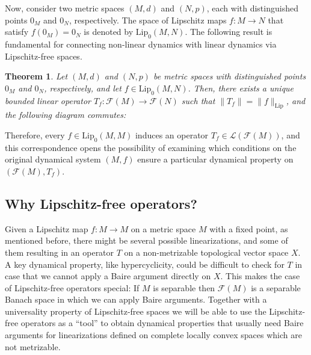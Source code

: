 \documentclass[12pt,english]{amsart}
\numberwithin{equation}{section}
\theoremstyle{plain}
\newtheorem{theorem}{Theorem}[section]
\theoremstyle{definition}
\def\lip{ \text{Lip}}
\begin{document}
Now, consider two metric spaces $(M,d)$ and $(N,p)$, each with distinguished points $0_M$ and $0_N$, respectively. The space of Lipschitz maps $f\colon M \to N$ that satisfy $f(0_M) = 0_N$ is denoted by $\lip_0(M,N)$. The following result is fundamental for connecting non-linear dynamics with linear dynamics via Lipschitz-free spaces.

\begin{theorem}\label{thm:linearization}
    Let $(M,d)$ and $(N,p)$ be metric spaces with distinguished points $0_M$ and $0_N$, respectively, and let $f \in \lip_0(M,N)$. Then, there exists a unique bounded linear operator $T_f \colon \mathcal{F}(M) \to \mathcal{F}(N)$ such that $\|T_f\| = \|f\|_{\text{Lip}}$, and the following diagram commutes:

    \begin{center}
    \end{center}
\end{theorem}

Therefore, every $f \in \lip_0(M,M)$ induces an operator $T_f \in \mathcal{L}(\mathcal{F}(M))$, and this correspondence opens the possibility of examining which conditions on the original dynamical system $(M,f)$ ensure a particular dynamical property on $(\mathcal{F}(M), T_f)$.

\subsection{Why Lipschitz-free operators?}\label{subsec:why}

Given a Lipschitz map $f\colon M\to M$ on a metric space $M$ with a fixed point, as mentioned before, there might be several possible linearizations, and some of them resulting in an operator $T$ on a non-metrizable topological vector space $X$. A key dynamical property, like hypercyclicity, could be difficult to check for $T$ in case that we cannot apply a Baire argument directly on $X$. This makes the case of Lipschitz-free operators special: If $M$ is separable then $\mathcal{F}(M)$ is a separable Banach space in which we can apply Baire arguments. Together with a universality property of Lipschitz-free spaces we will be able to use the Lipschitz-free operators as a ``tool'' to obtain dynamical properties that usually need Baire arguments for linearizations defined on complete locally convex spaces which are not metrizable. 
\end{document}
